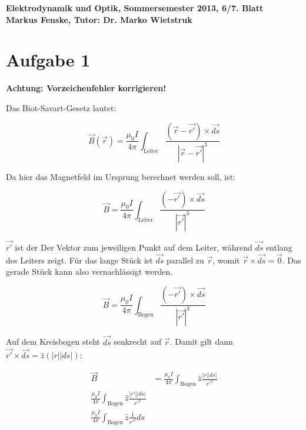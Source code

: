\documentclass[a4paper,german,12pt,smallheadings]{scrartcl}
\begin{document}
\begin{center}
\bfseries %
\sffamily %
\vspace{-40pt}
Elektrodynamik und Optik, Sommersemester 2013, 6/7. Blatt \\
Markus Fenske, Tutor: Dr. Marko Wietstruk
\vspace{-10pt}
\end{center}
\section*{Aufgabe 1}
\textbf{Achtung: Vorzeichenfehler korrigieren!}

Das Biot-Savart-Gesetz lautet:

\begin{equation}
  \vec{B}(\vec{r}) = \frac{\mu_0 I}{4 \pi} \int_{\text{Leiter}} \frac{(\vec{r} - \vec{r'}) \times \vec{ds}}{|\vec{r}-\vec{r'}|^3}
\end{equation}

Da hier das Magnetfeld im Ursprung berechnet werden soll, ist:


\begin{equation}
  \vec{B} = \frac{\mu_0 I}{4 \pi} \int_{\text{Leiter}} \frac{(-\vec{r'}) \times \vec{ds}}{|\vec{r'}|^3}
\end{equation}

$\vec{r'}$ ist der Der Vektor zum jeweiligen Punkt auf dem Leiter, während
$\vec{ds}$ entlang des Leiters zeigt. Für das lange Stück ist $\vec{ds}$
parallel zu $\vec{r}$, womit $\vec{r} \times \vec{ds} = \vec{0}$. Das gerade
Stück kann also vernachlässigt werden.

\begin{equation}
  \vec{B} = \frac{\mu_0 I}{4 \pi} \int_{\text{Bogen}} \frac{(-\vec{r'}) \times \vec{ds}}{|\vec{r'}|^3}
\end{equation}

Auf dem Kreisbogen steht $\vec{ds}$ senkrecht auf $\vec{r}$. Damit gilt dann
$\vec{r'} \times \vec{ds} = \widehat{z} (|r| |ds|)$:

\begin{align}
  \vec{B} &= \frac{\mu_0 I}{4 \pi} \int_{\text{Bogen}} \widehat{z} \frac{|r| |ds|}{r'^3} \\
  \frac{\mu_0 I}{4 \pi} \int_{\text{Bogen}} \widehat{z} \frac{|r'| |ds|}{r'^3} \\
  \frac{\mu_0 I}{4 \pi} \int_{\text{Bogen}} \widehat{z} \frac{1}{r'^2} ds \\
\end{align}
\end{document}
